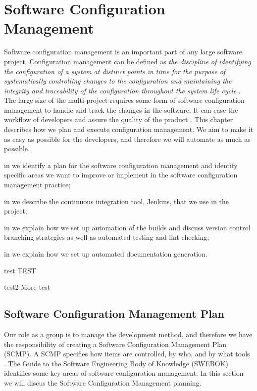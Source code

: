 \chapter{Software Configuration Management}\label{chap:config_management}
Software configuration management is an important part of any large software project. Configuration management can be defined as \emph{the discipline of identifying the configuration of a system at distinct points in time for the purpose of systematically controlling changes to the configuration and maintaining the integrity and traceability of the configuration throughout the system life cycle} \parencite[ch.6, p.6-1]{swebok}. The large size of the multi-project requires some form of software configuration management to handle and track the changes in the software. It can ease the workflow of developers and assure the quality of the product \parencite[ch.6]{swebok}. This chapter describes how we plan and execute configuration management. We aim to make it as easy as possible for the developers, and therefore we will automate as much as possible.

\begin{chapterorganization}
  \item in  we identify a plan for the software configuration management and identify specific areas we want to improve or implement in the software configuration management practice;
  \item in  we describe the continuous integration tool, Jenkins, that we use in the project;
  \item in  we explain how we set up automation of the builds and discuss version control branching strategies as well as automated testing and lint checking;
  \item in  we explain how we set up automated documentation generation.
\end{chapterorganization}

\begin{abbreviations}
  \item[test] TEST
  \item[test2] More test
\end{abbreviations}

\section{Software Configuration Management Plan}\label{sec:SCM_vision}
Our role as a group is to manage the development method, and therefore we have the responsibility of creating a Software Configuration Management Plan (SCMP). A SCMP specifies how items are controlled, by who, and by what tools \parencite{swebok}. The Guide to the Software Engineering Body of Knowledge (SWEBOK) \parencite{swebok} identifies some key areas of software configuration management. In this section we will discus the Software Configuration Management planning.

